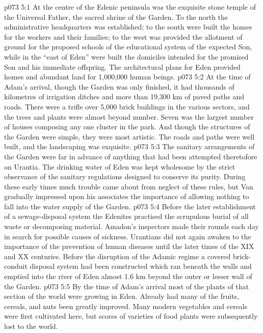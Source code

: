 \vs p073 5:1 At the centre of the Edenic peninsula was the exquisite stone temple of the Universal Father, the sacred shrine of the Garden. To the north the administrative headquarters was established; to the south were built the homes for the workers and their families; to the west was provided the allotment of ground for the proposed schools of the educational system of the expected Son, while in the “east of Eden” were built the domiciles intended for the promised Son and his immediate offspring. The architectural plans for Eden provided homes and abundant land for 1,000,000 human beings.
\vs p073 5:2 At the time of Adam’s arrival, though the Garden was only  finished, it had thousands of kilometres of irrigation ditches and more than 19,300 km of paved paths and roads. There were a trifle over 5,000 brick buildings in the various sectors, and the trees and plants were almost beyond number. Seven was the largest number of houses composing any one cluster in the park. And though the structures of the Garden were simple, they were most artistic. The roads and paths were well built, and the landscaping was exquisite.
\vs p073 5:3 The sanitary arrangements of the Garden were far in advance of anything that had been attempted theretofore on Urantia. The drinking water of Eden was kept wholesome by the strict observance of the sanitary regulations designed to conserve its purity. During these early times much trouble came about from neglect of these rules, but Van gradually impressed upon his associates the importance of allowing nothing to fall into the water supply of the Garden.
\vs p073 5:4 Before the later establishment of a sewage\hyp{}disposal system the Edenites practised the scrupulous burial of all waste or decomposing material. Amadon’s inspectors made their rounds each day in search for possible causes of sickness. Urantians did not again awaken to the importance of the prevention of human diseases until the later times of the XIX and XX centuries. Before the disruption of the Adamic regime a covered brick\hyp{}conduit disposal system had been constructed which ran beneath the walls and emptied into the river of Eden almost 1.6 km beyond the outer or lesser wall of the Garden.
\vs p073 5:5 By the time of Adam’s arrival most of the plants of that section of the world were growing in Eden. Already had many of the fruits, cereals, and nuts been greatly improved. Many modern vegetables and cereals were first cultivated here, but scores of varieties of food plants were subsequently lost to the world.
